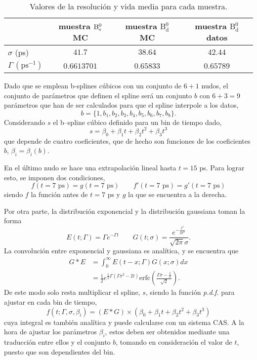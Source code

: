 \begin{table}[H]
\centering
\begin{tabular}{lccc} \toprule
& muestra $\mathrm{B}{}_{\mathrm{s}}^{0}$ MC  & muestra $\text{B}{}_{\text{d}}^0$ MC  & muestra $\text{B}{}_{\text{d}}^0$ datos \\ \midrule
$\sigma$ (ps) & $41.7$ & $38.64$ & $42.44$ \\
$\Gamma \, \mathrm{(ps^{-1})}$ & $0.6613701$ & $0.65833$ & $0.65789$ \\
\bottomrule
\end{tabular}  
\caption{Valores de la resolución y vida media para cada muestra.} \label{tab_dectimeacc}
\end{table} 







Dado que se emplean b-splines cúbicos con un conjunto de $6+1$ nudos, el conjunto de parámetros que definen el spline será un conjunto $b$ con $6+3=9$ parámetros que han de ser calculados para que el spline interpole a los datos,
\begin{equation}
  b = \{1,b_1,b_2,b_3,b_4,b_5,b_6,b_7,b_8\}.
\end{equation} 
Considerando $s$ el b--spline cúbico definido para un bin de tiempo dado,
\begin{equation}
  s = \beta_0 + \beta_1 t + \beta_2 t^2 + \beta_3 t^3
\end{equation}
que depende de cuatro coeficientes, que de hecho son funciones de los coeficientes $b$, $\beta_i = \beta_i(b)$.

En el último nudo se hace una extrapolación lineal hasta $t=15$ ps. Para lograr esto, se imponen dos condiciones, 
\[f(t=7 \text{ ps}) = g(t=7 \text{ ps}) \qquad f'(t=7 \text{ ps}) = g'(t=7 \text{ ps}) \]
siendo $f$ la función antes de $t=7$ ps y $g$ la que se encuentra a la derecha.


Por otra parte, la distribución exponencial y la distribución gaussiana toman la forma
\[E(t;\Gamma) = \Gamma e^{-\Gamma t}
\qquad 
G(t;\sigma) = \frac{e^{-\frac{t^2}{2 \sigma^2}}}{\sqrt{2 \pi } \sigma}.\]
La convolución entre exponencial y gaussiana es analítica, y se encuentra que
\begin{equation}
\begin{split}
    G * E &= \int_0^{\infty} E(t-x;\Gamma) G(x;\sigma) dx\\ &= \frac{1}{2} e^{\frac{1}{2} \Gamma \left(\Gamma \sigma^2-2 t\right)} \text{erfc}\left(\frac{\Gamma \sigma-\frac{t}{\sigma}}{\sqrt{2}}\right).
\end{split}
\end{equation}
%
De este modo solo resta multiplicar el spline, $s$, siendo la función \textit{p.d.f.} para ajustar en cada bin de tiempo,
\begin{equation}
 f(t;\Gamma,\sigma,\beta_i) =  (E * G) \times (\beta_0 + \beta_1 t + \beta_2 t^2 + \beta_3 t^3)
\end{equation}
cuya integral es también analítica y puede calcularse con un sistema CAS. A la hora de ajustar los parámetros $\beta_i$, estos deben ser obtenidos mediante una traducción entre ellos y el conjunto $b$, tomando en consideración el valor de $t$, puesto que son dependientes del bin.

